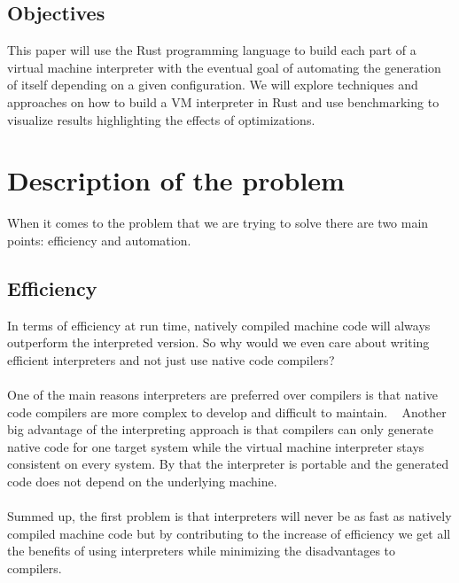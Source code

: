 \documentclass{article}
\begin{document}
\subsection{Objectives} 
This paper will use the Rust programming language to
build each part of a virtual machine interpreter with the eventual goal of
automating the generation of itself depending on a given configuration. We will
explore techniques and approaches on how to build a VM interpreter in Rust and
use benchmarking to visualize results highlighting the effects of
optimizations.

\section{Description of the problem}
When it comes to the problem that we are trying to solve there are two main
points: efficiency and automation.

\subsection{Efficiency}
In terms of efficiency at run time, natively compiled machine code will always
outperform the interpreted version. So why would we even care about writing
efficient interpreters and not just use native code compilers?
\\ \\
One of the main reasons interpreters are preferred over compilers is that
native code compilers are more complex to develop and difficult to maintain.
~\cite{structure_and_performance} Another big advantage of the interpreting
approach is that compilers can only generate native code for one target system
while the virtual machine interpreter stays consistent on every system. By that
the interpreter is portable and the generated code does not depend on the
underlying machine.
\\ \\
Summed up, the first problem is that interpreters will never be as fast as
natively compiled machine code but by contributing to the increase of efficiency
we get all the benefits of using interpreters while minimizing the
disadvantages to compilers.
\end{document}

